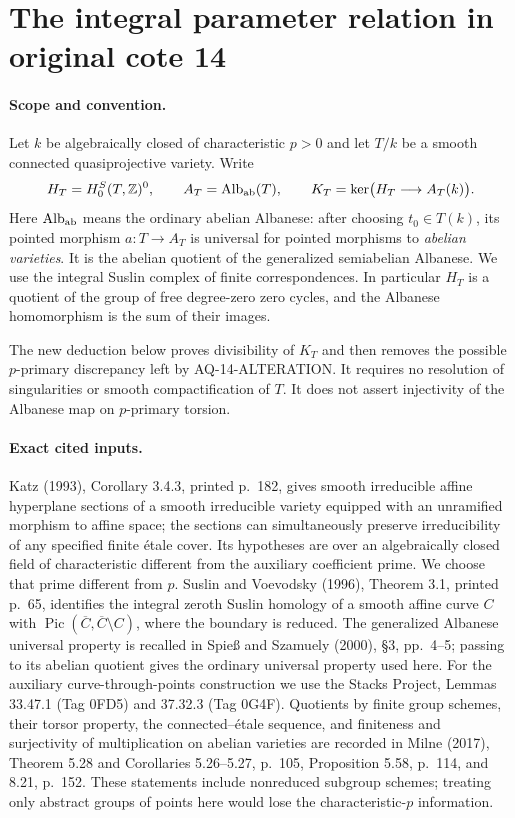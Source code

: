 \section{The integral parameter relation in original cote 14}
\label{sec:cc-integral-albanese}

\paragraph{Scope and convention.}
Let $k$ be algebraically closed of characteristic $p>0$ and
let $T/k$ be a smooth connected quasiprojective variety.
Write
\[
 H_T=H^S_0(T,\mathbb Z)^0,\qquad
 A_T=\operatorname{Alb}_{\rm ab}(T),\qquad
 K_T=\ker\bigl(H_T\longrightarrow A_T(k)\bigr).
\]
Here $\operatorname{Alb}_{\rm ab}$ means the ordinary abelian
Albanese: after choosing $t_0\in T(k)$, its pointed morphism
$a:T\to A_T$ is universal for pointed morphisms to
\emph{abelian varieties}.  It is the abelian quotient of the
generalized semiabelian Albanese.  We use the integral Suslin
complex of finite correspondences.  In particular $H_T$ is a
quotient of the group of free degree-zero zero cycles, and
the Albanese homomorphism is the sum of their images.

The new deduction below proves divisibility of $K_T$ and
then removes the possible $p$-primary discrepancy left by
AQ-14-ALTERATION.  It requires no resolution of singularities
or smooth compactification of $T$.  It does not assert
injectivity of the Albanese map on $p$-primary torsion.

\paragraph{Exact cited inputs.}
Katz (1993), Corollary 3.4.3, printed p.~182, gives smooth
irreducible affine hyperplane sections of a smooth
irreducible variety equipped with an unramified morphism to
affine space; the sections can simultaneously preserve
irreducibility of any specified finite \'{e}tale cover.
Its hypotheses are over an algebraically closed field of
characteristic different from the auxiliary coefficient
prime.  We choose that prime different from $p$.
Suslin and Voevodsky (1996), Theorem 3.1, printed p.~65,
identifies the integral zeroth Suslin homology of a smooth
affine curve $C$ with
$\operatorname{Pic}(\overline C,\overline C\setminus C)$,
where the boundary is reduced.
The generalized Albanese universal property is recalled
in Spie{\ss} and Szamuely (2000), \S3, pp.~4--5;
passing to its abelian quotient gives the ordinary
universal property used here.
For the auxiliary curve-through-points construction we
use the Stacks Project, Lemmas 33.47.1 (Tag 0FD5) and
37.32.3 (Tag 0G4F).
Quotients by finite group schemes, their torsor property,
the connected--\'{e}tale sequence, and finiteness and
surjectivity of multiplication on abelian varieties are
recorded in Milne (2017), Theorem 5.28 and Corollaries
5.26--5.27, p.~105, Proposition 5.58, p.~114, and 8.21,
p.~152.  These statements include nonreduced subgroup
schemes; treating only abstract groups of points here
would lose the characteristic-$p$ information.

